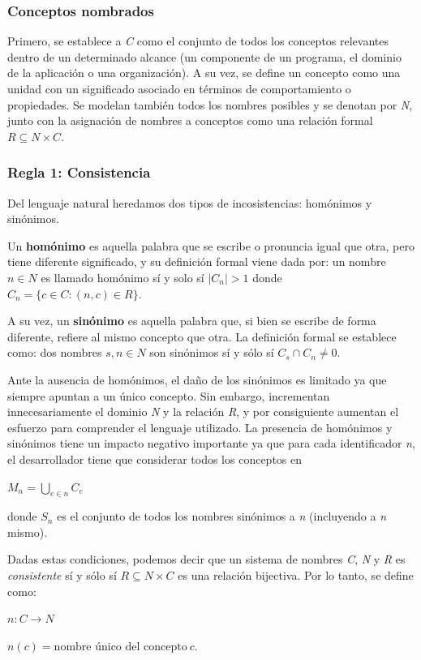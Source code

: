 \subsubsection{Conceptos nombrados}
Primero, se establece a \textit{C} como el conjunto de todos los conceptos relevantes dentro de un determinado alcance (un componente de un programa, el dominio de la aplicación o una organización). 
A su vez, se define un concepto como una unidad con un significado asociado en términos de comportamiento o propiedades. 
Se modelan también todos los nombres posibles y se denotan por \textit{N}, junto con la asignación de nombres a conceptos como una relación formal $R \subseteq N \times C$.

\subsubsection{Regla 1: Consistencia}
Del lenguaje natural heredamos dos tipos de incosistencias: homónimos y sinónimos.

Un \textbf{homónimo} es aquella palabra que se escribe o pronuncia igual que otra, pero tiene diferente significado, y su definición formal viene dada por: un nombre $n \in N$ es llamado homónimo sí y solo sí $|C_n| > 1$ donde $C_n = \{ c \in C : (n,c) \in R\}$.

A su vez, un \textbf{sinónimo} es aquella palabra que, si bien se escribe de forma diferente, refiere al mismo concepto que otra. 
La definición formal se establece como: dos nombres $s,n \in N$ son sinónimos sí y sólo sí $C_s \cap C_n \neq 0$.

Ante la ausencia de homónimos, el daño de los sinónimos es limitado ya que siempre apuntan a un único concepto. 
Sin embargo, incrementan innecesariamente el dominio \textit{N} y la relación \textit{R}, y por consiguiente aumentan el esfuerzo para comprender el lenguaje utilizado. 
La presencia de homónimos y sinónimos tiene un impacto negativo importante ya que para cada identificador \textit{n}, el desarrollador tiene que considerar todos los conceptos en
\begin{center}
  $M_n = \bigcup_{e \in n} C_e$
\end{center}
donde $S_n$ es el conjunto de todos los nombres sinónimos a \textit{n} (incluyendo a \textit{n} mismo).

Dadas estas condiciones, podemos decir que un sistema de nombres \textit{C}, \textit{N} y \textit{R} es \textit{consistente} sí y sólo sí $R \subseteq N \times C$ es una relación bijectiva. 
Por lo tanto, se define como:
\begin{center}
  $n : C \rightarrow N$
  
  $n(c) = \mbox{nombre único del concepto} \ c$.  
\end{center}


